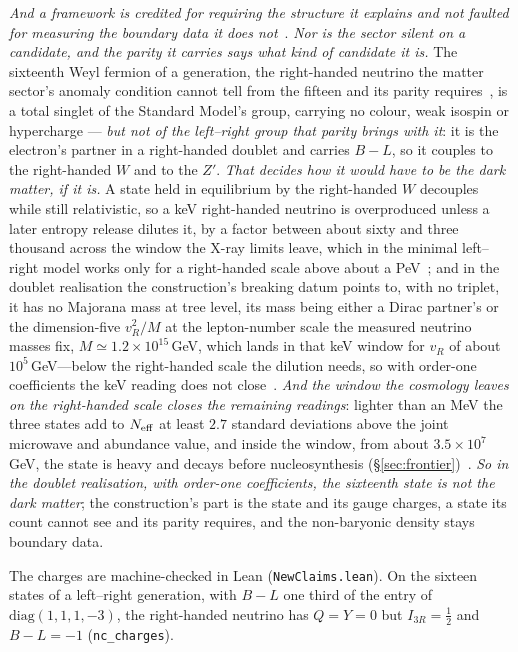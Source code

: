 \documentclass[11pt,a4paper]{article}
\theoremstyle{plain}
\theoremstyle{definition}
\begin{document}
\emph{And a framework is credited for requiring the structure it explains and not faulted for measuring the
boundary data it does not}~\cite{JanzenCRcosmology}. \emph{Nor is the sector silent on a candidate, and the
parity it carries says what kind of candidate it is.} The sixteenth Weyl fermion of a generation, the
right-handed neutrino the matter sector's anomaly condition cannot tell from the fifteen and its parity
requires~\cite{JanzenMatter}, is a total singlet of the Standard Model's group, carrying no colour, weak isospin
or hypercharge --- \emph{but not of the left--right group that parity brings with it}: it is the electron's
partner in a right-handed doublet and carries $B{-}L$, so it couples to the right-handed $W$ and to the $Z'$.
\emph{That decides how it would have to be the dark matter, if it is.} A state held in equilibrium by the
right-handed $W$ decouples while still relativistic, so a keV right-handed neutrino is overproduced unless a
later entropy release dilutes it, by a factor between about sixty and three thousand across the window the X-ray
limits leave, which in the minimal left--right model works only for a right-handed scale above about a
PeV~\cite{BezrukovHettmanspergerLindner2010,NemevsekZhang2023}; and in the doublet realisation the construction's
breaking datum points to, with no triplet, it has no Majorana mass at tree level, its mass being either a Dirac
partner's or the dimension-five $v_R^{2}/M$ at the lepton-number scale the measured neutrino masses fix,
$M\simeq1.2\times10^{15}$\,GeV, which lands in that keV window for $v_R$ of about $10^{5}$\,GeV---below the right-handed
scale the dilution needs, so with order-one coefficients the keV reading does not close~\cite{JanzenCRcosmology}.
\emph{And the window the cosmology leaves on the right-handed scale closes the remaining readings}: lighter than
an MeV the three states add to $N_{\rm eff}$ at least $2.7$ standard deviations above the joint microwave and
abundance value, and inside the window, from about $3.5\times10^{7}$\,GeV, the state is heavy and decays before
nucleosynthesis (\S\ref{sec:frontier})~\cite{JanzenCRcosmology}. \emph{So in the doublet realisation, with
order-one coefficients, the sixteenth state is not the dark matter}; the construction's part is the state and its
gauge charges, a state its count cannot see and its parity requires, and the non-baryonic density stays boundary
data.

The charges are machine-checked in Lean (\texttt{NewClaims.lean}). On the sixteen states of a left--right generation, with $B{-}L$ one third of the entry of $\mathrm{diag}(1,1,1,-3)$, the right-handed neutrino has $Q=Y=0$ but $I_{3R}=\tfrac{1}{2}$ and $B{-}L=-1$ (\texttt{nc\_charges}).
\end{document}

